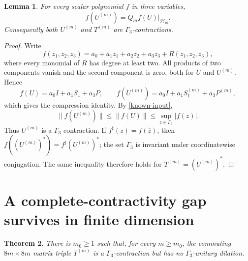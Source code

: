 \documentclass[11pt]{article}
\newtheorem{theorem}{Theorem}
\newtheorem{lemma}[theorem]{Lemma}
\newcommand{\G}{\Gamma_3}
\newcommand{\cH}{\mathcal H}
\begin{document}
\begin{lemma}\label{compression-lemma}
For every scalar polynomial $f$ in three variables,
\[
 f(U^{(m)})=Q_m f(U)|_{\cH_m}.
\]
Consequently both $U^{(m)}$ and $T^{(m)}$ are $\G$-contractions.
\end{lemma}

\begin{proof}
Write
\[
 f(z_1,z_2,z_3)=a_0+a_1z_1+a_2z_2+a_3z_3+R(z_1,z_2,z_3),
\]
where every monomial of $R$ has degree at least two.  All products of two
components vanish and the second component is zero, both for $U$ and
$U^{(m)}$.  Hence
\[
 f(U)=a_0I+a_1S_1+a_3P,
 \qquad
 f(U^{(m)})=a_0I+a_1S_1^{(m)}+a_3P^{(m)},
\]
which gives the compression identity.  By \eqref{known-input},
\[
 \|f(U^{(m)})\|\leq\|f(U)\|
 \leq\sup_{z\in\G}|f(z)|.
\]
Thus $U^{(m)}$ is a $\G$-contraction.  If
$f^{\sharp}(z)=\overline{f(\overline z)}$, then
$f((U^{(m)})^*)=f^{\sharp}(U^{(m)})^*$; the set $\G$ is invariant under
coordinatewise conjugation.  The same inequality therefore holds for
$T^{(m)}=(U^{(m)})^*$.
\end{proof}

\section{A complete-contractivity gap survives in finite dimension}

\begin{theorem}\label{main-theorem}
There is $m_0\geq1$ such that, for every $m\geq m_0$, the commuting
$8m\times8m$ matrix triple $T^{(m)}$ is a $\G$-contraction but has no
$\G$-unitary dilation.
\end{theorem}
\end{document}
